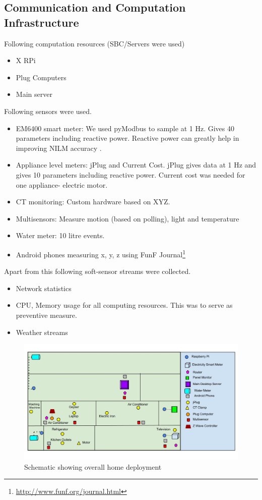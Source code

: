 \documentclass[10pt]{sensys-proc}
\begin{document}
\subsection{Communication and Computation Infrastructure}
Following computation resources (SBC/Servers were used)
\begin{itemize}
\item X RPi
\item Plug Computers
\item Main server
\end{itemize}
Following sensors were used.
\begin{itemize}
\item EM6400 smart meter: We used pyModbus to sample at 1 Hz. Gives 40 parameters including reactive power. Reactive power can greatly help in improving NILM accuracy \cite{hart}. 
\item Appliance level meters: jPlug and Current Cost. jPlug gives data at 1 Hz and gives 10 parameters including reactive power. Current cost was needed for one appliance- electric motor.
\item CT monitoring: Custom hardware based on  XYZ.
\item Multisensors: Measure motion (based on polling), light and temperature
\item Water meter: 10 litre events. 
\item Android phones measuring x, y, z using FunF Journal\footnote{\url{http://www.funf.org/journal.html}}
\end{itemize}
Apart from this following soft-sensor streams were collected.
\begin{itemize}
\item Network statistics
\item CPU, Memory usage for all computing resources. This was to serve as preventive measure.
\item Weather streams
\end{itemize}
\begin{figure}     
    \includegraphics[scale=0.4]{./figures/overall_deployment.jpg}    
    \caption{Schematic showing overall home deployment}   
    \label{fig:overall}
   
\end{figure}
\end{document}
